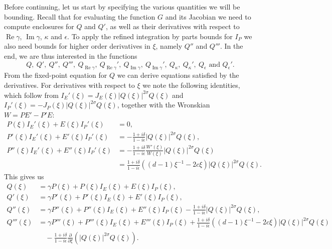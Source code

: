 \documentclass[11pt]{article}
\DeclareMathOperator{\real}{Re}
\DeclareMathOperator{\imag}{Im}
\begin{document}
Before continuing, let us start by specifying the various quantities
we will be bounding. Recall that for evaluating the function \(G\) and
its Jacobian we need to compute enclosures for \(Q\) and \(Q'\), as
well as their derivatives with respect to \(\real\gamma\),
\(\imag\gamma\), \(\kappa\) and \(\epsilon\). To apply the refined
integration by parts bounds for \(I_{P}\) we also need bounds for
higher order derivatives in \(\xi\), namely \(Q''\) and \(Q'''\). In
the end, we are thus interested in the functions
\begin{equation*}
  Q,\ Q',\ Q'',\ Q''',\ Q_{\real\gamma},\ Q_{\real\gamma}',\ Q_{\imag\gamma},\ Q_{\imag\gamma}',\ Q_{\kappa},\ Q_{\kappa}',\ Q_{\epsilon} \text{ and } Q_{\epsilon}'.
\end{equation*}
From the fixed-point equation for \(Q\) we can derive equations
satisfied by the derivatives. For derivatives with respect to \(\xi\)
we note the following identities, which follow from
\(I_{E}'(\xi) = J_{E}(\xi)|Q(\xi)|^{2\sigma}Q(\xi)\) and
\(I_{P}'(\xi) = -J_{P}(\xi)|Q(\xi)|^{2\sigma}Q(\xi)\), together with
the Wronskian \(W = PE' - P'E\):
\begin{align*}
  P(\xi)I_{E}'(\xi) + E(\xi)I_{P}'(\xi)
  &= 0,\\
  P'(\xi)I_{E}'(\xi) + E'(\xi)I_{P}'(\xi)
  &= -\frac{1 + i\delta}{1 - i\epsilon}|Q(\xi)|^{2\sigma}Q(\xi),\\
  P''(\xi)I_{E}'(\xi) + E''(\xi)I_{P}'(\xi)
  &= -\frac{1 + i\delta}{1 - i\epsilon}\frac{W'(\xi)}{W(\xi)}|Q(\xi)|^{2\sigma}Q(\xi)\\
  &= \frac{1 + i\delta}{1 - i\epsilon}((d - 1)\xi^{-1} - 2c\xi)|Q(\xi)|^{2\sigma}Q(\xi).
\end{align*}
This gives us
\begin{align*}
  Q(\xi)
  &= \gamma P(\xi)
    + P(\xi)I_{E}(\xi) + E(\xi)I_{P}(\xi),\\
  Q'(\xi)
  &= \gamma P'(\xi)
    + P'(\xi)I_{E}(\xi) + E'(\xi)I_{P}(\xi),\\
  Q''(\xi)
  &= \gamma P''(\xi)
    + P''(\xi)I_{E}(\xi)
    + E''(\xi)I_{P}(\xi)
    - \frac{1 + i\delta}{1 - i\epsilon}|Q(\xi)|^{2\sigma}Q(\xi),\\
  Q'''(\xi)
  &= \gamma P'''(\xi)
    + P'''(\xi)I_{E}(\xi)
    + E'''(\xi)I_{P}(\xi)
    + \frac{1 + i\delta}{1 - i\epsilon}((d - 1)\xi^{-1} - 2c\xi)|Q(\xi)|^{2\sigma}Q(\xi)\\
    &\quad- \frac{1 + i\delta}{1 - i\epsilon}\frac{\partial}{\partial \xi}\left(|Q(\xi)|^{2\sigma}Q(\xi)\right).
\end{align*}
\end{document}
